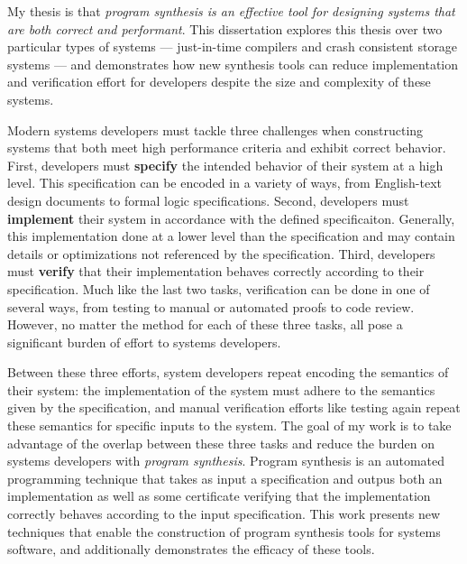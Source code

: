 My thesis is that \textit{program
synthesis is an effective tool for designing systems that are both correct and
performant}.  This dissertation explores this thesis over two particular types
of systems --- just-in-time compilers and crash consistent storage systems ---
and demonstrates how new synthesis tools can reduce implementation and verification
effort for developers despite the size and complexity of these systems.


Modern systems developers must tackle three challenges when constructing
systems that both meet high performance criteria and exhibit correct behavior.
First, developers must \textbf{specify} the intended behavior of their system at a high
level. This specification can be encoded in a variety of ways, from
English-text design documents to formal logic specifications.
Second, developers must \textbf{implement} their system in accordance with the defined
specificaiton. Generally, this implementation done at a lower level than the
specification and may contain details or optimizations not referenced by the specification.
Third, developers must \textbf{verify} that their implementation behaves correctly 
according to their specification. Much like the last two tasks, verification can be done
in one of several ways, from testing to manual or automated proofs to code review.
However, no matter the method for each of these three tasks,
all pose a significant burden of effort to systems developers.

Between these three efforts, system developers repeat encoding the semantics of
their system: the implementation of the system must adhere to the semantics
given by the specification, and manual verification efforts like testing again
repeat these semantics for specific inputs to the system.
The goal of my work is to take advantage of the overlap between these three tasks
and reduce the burden on systems developers with \textit{program synthesis}.
Program synthesis is an automated programming technique
that takes as input a specification and outpus both an implementation
as well as some certificate verifying that the implementation correctly behaves
according to the input specification.
This work presents new techniques that enable the construction of program
synthesis tools for systems software, and additionally demonstrates the
efficacy of these tools.


